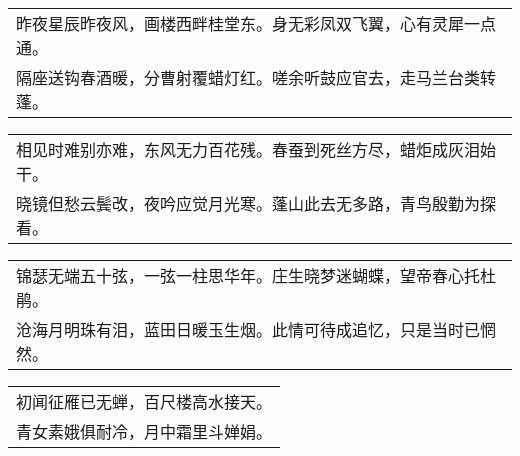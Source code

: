 \nopagebreak%
\nopagebreak%
\noindent\begin{minipage}{\linewidth}
  \vskip-3pt\begin{table}[H]
    \centering
    \begin{tabular}{@{}l@{}}
昨夜星辰昨夜风，画楼西畔桂堂东。身无彩凤双飞翼，心有灵犀一点通。\\
隔座送钩春酒暖，分曹射覆蜡灯红。嗟余听鼓应官去，走马兰台类转蓬。
    \end{tabular}
  \end{table}
\end{minipage}
\vspace{1cm}


\nopagebreak%
\nopagebreak%
\noindent\begin{minipage}{\linewidth}
  \vskip-3pt\begin{table}[H]
    \centering
    \begin{tabular}{@{}l@{}}
相见时难别亦难，东风无力百花残。春蚕到死丝方尽，蜡炬成灰泪始干。\\
晓镜但愁云鬓改，夜吟应觉月光寒。蓬山此去无多路，青鸟殷勤为探看。
    \end{tabular}
  \end{table}
\end{minipage}
\vspace{1cm}


\nopagebreak%
\nopagebreak%
\noindent\begin{minipage}{\linewidth}
  \vskip-3pt\begin{table}[H]
    \centering
    \begin{tabular}{@{}l@{}}
锦瑟无端五十弦，一弦一柱思华年。庄生晓梦迷蝴蝶，望帝春心托杜鹃。\\
沧海月明珠有泪，蓝田日暖玉生烟。此情可待成追忆，只是当时已惘然。
    \end{tabular}
  \end{table}
\end{minipage}
\vspace{1cm}


\nopagebreak%
\nopagebreak%
\noindent\begin{minipage}{\linewidth}
  \vskip-3pt\begin{table}[H]
    \centering
    \begin{tabular}{@{}l@{}}
初闻征雁已无蝉，百尺楼高水接天。\\
青女素娥俱耐冷，月中霜里斗婵娟。
    \end{tabular}
  \end{table}
\end{minipage}
\vspace{1cm}



